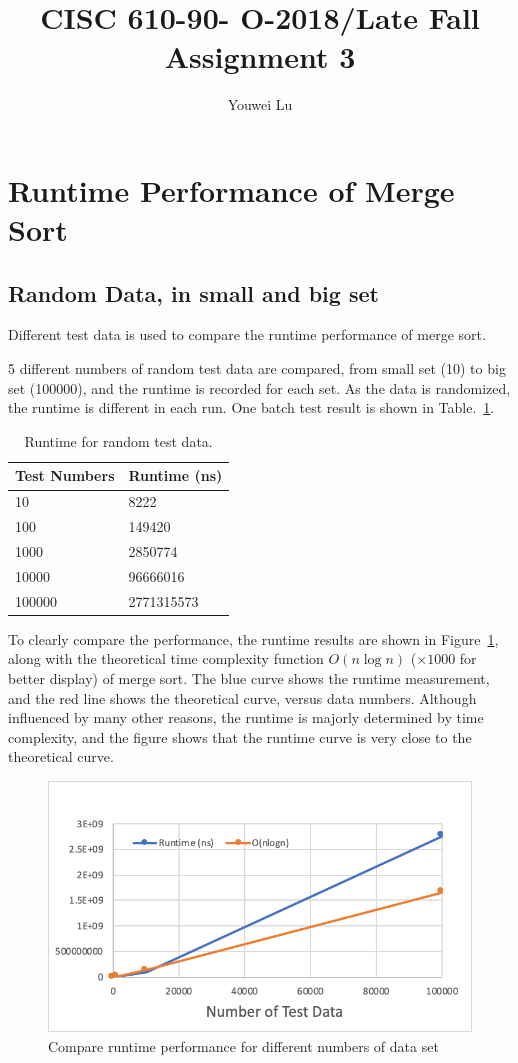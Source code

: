 \documentclass[natbib,12pt]{article}
\title{CISC 610-90- O-2018/Late Fall Assignment 3}
\author{Youwei Lu}
\date{}
\begin{document}
\maketitle
	
	\section{Runtime Performance of Merge Sort}
	\subsection{Random Data, in small and big set}
	Different test data is used to compare the runtime performance of merge sort. 
	
5 different numbers of random test data are compared, from small set (10) to big set (100000), and the runtime is recorded for each set. As the data is randomized, the runtime is different in each run. One batch test result is shown in Table.~\ref{tab:randomTest}.

	\begin{table}[htpb]
	\centering
	\begin{tabular}{l|l}
		Test Numbers & Runtime (ns) \\\hline
		10 & 8222 \\
		100 & 149420  \\
		1000 & 2850774 \\
		10000 & 96666016 \\
		100000 & 2771315573 
	\end{tabular}
	\caption{\label{tab:randomTest}Runtime for random test data.}
	\end{table}

To clearly compare the performance, the runtime results are shown in Figure~\ref{fig:mergesort}, along with the theoretical time complexity function $O(n\log n)$ ($\times 1000$ for better display) of merge sort. The blue curve shows the runtime measurement, and the red line shows the theoretical curve, versus data numbers. Although influenced by many other reasons, the runtime is majorly determined by time complexity, and the figure shows that the runtime curve is very close to the theoretical curve. 
	
\begin{figure}[htpb]
	\centering
	\includegraphics[width=1\linewidth]{merge_sort}
	\caption{Compare runtime performance for different numbers of data set}
	\label{fig:mergesort}
\end{figure}
\end{document}
